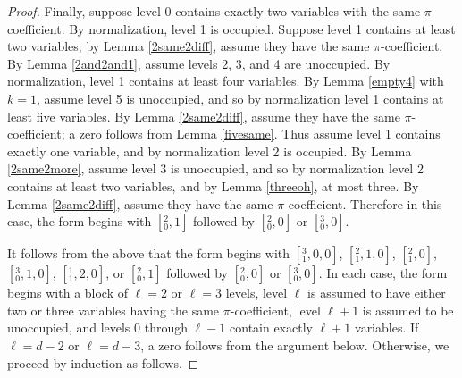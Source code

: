 \documentclass[12pt]{amsart}
\begin{document}
\begin{proof}

Finally, suppose level 0 contains exactly two variables with the same $\pi$-coefficient.  By normalization, level 1 is occupied. Suppose level 1 contains at least two variables; by Lemma \ref{2same2diff}, assume they have the same $\pi$-coefficient.  By Lemma \ref{2and2and1}, assume levels 2, 3, and 4 are unoccupied.
By normalization, level 1 contains at least four variables.  By Lemma \ref{empty4} with $k=1$, assume level 5 is unoccupied, and so by normalization level 1 contains at least five variables.  By Lemma \ref{2same2diff}, assume they have the same $\pi$-coefficient; a zero follows from Lemma \ref{fivesame}. Thus assume level 1 contains exactly one variable, and by normalization level 2 is occupied.  By Lemma \ref{2same2more}, assume level 3 is unoccupied, and so by normalization level 2 contains at least two variables, and by Lemma \ref{threeoh}, at most three.  By Lemma \ref{2same2diff}, assume they have the same $\pi$-coefficient.  Therefore in this case, the form begins with $[{}^2_0, 1]$ followed by $[{}^2_0,0]$ or $[{}^3_0,0]$.



It follows from the above that the form begins with $[{}^3_1,0,0]$, $[{}^2_1,1,0]$, $[{}^2_1,0]$, $[{}^3_0,1,0]$, $[{}^1_1,2,0]$, or $[{}^2_0, 1]$ followed by $[{}^2_0, 0]$ or $[{}^3_0, 0]$.  In each case, the form begins with a block of $\ell = 2$ or $\ell = 3$ levels, level $\ell$ is assumed to have either two or three variables having the same $\pi$-coefficient, level $\ell + 1$ is assumed to be unoccupied, and levels 0 through $\ell - 1$ contain exactly $\ell + 1$ variables.  If $\ell = d-2$ or $\ell = d-3$, a zero follows from the argument below.  Otherwise, we proceed by induction as follows.


\end{proof}
\end{document}
